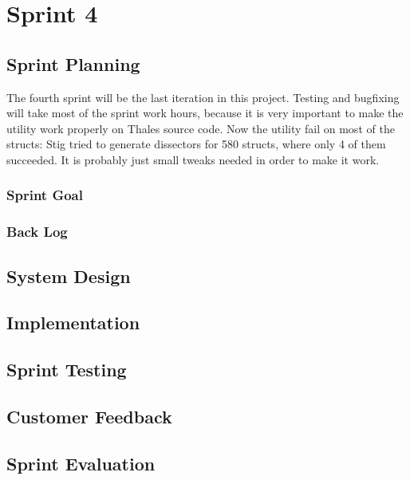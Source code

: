 \chapter{Sprint 4}


\section{Sprint Planning}
The fourth sprint will be the last iteration in this project. Testing and bugfixing will take most of the sprint work hours, because it is very important to make the utility work properly on Thales source code. Now the utility fail on most of the structs: Stig tried to generate dissectors for 580 structs, where only 4 of them succeeded. It is probably just small tweaks needed in order to make it work. 


\subsection{Sprint Goal}

\subsection{Back Log}


\section{System Design}


\section{Implementation}


\section{Sprint Testing}


\section{Customer Feedback}


\section{Sprint Evaluation}


